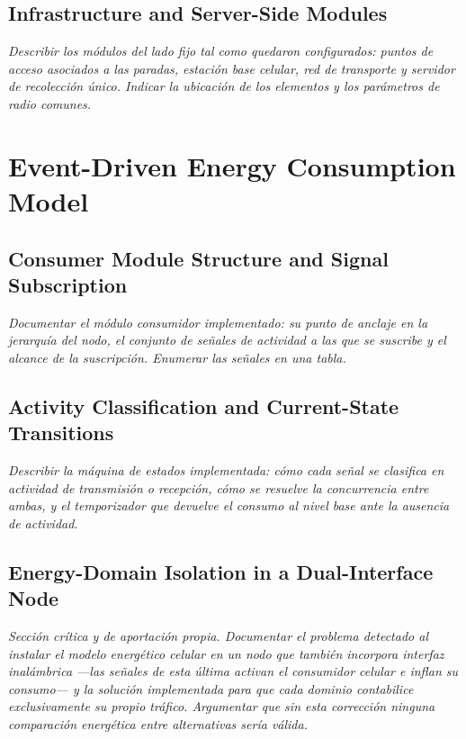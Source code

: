 \subsection{Infrastructure and Server-Side Modules}
\emph{Describir los módulos del lado fijo tal como quedaron configurados: puntos
de acceso asociados a las paradas, estación base celular, red de transporte y
servidor de recolección único. Indicar la ubicación de los elementos y los
parámetros de radio comunes.}

\section{Event-Driven Energy Consumption Model}

\subsection{Consumer Module Structure and Signal Subscription}
\emph{Documentar el módulo consumidor implementado: su punto de anclaje en la
jerarquía del nodo, el conjunto de señales de actividad a las que se suscribe y
el alcance de la suscripción. Enumerar las señales en una tabla.}

\subsection{Activity Classification and Current-State Transitions}
\emph{Describir la máquina de estados implementada: cómo cada señal se clasifica
en actividad de transmisión o recepción, cómo se resuelve la concurrencia entre
ambas, y el temporizador que devuelve el consumo al nivel base ante la ausencia
de actividad.}

\subsection{Energy-Domain Isolation in a Dual-Interface Node}
\emph{Sección crítica y de aportación propia. Documentar el problema detectado al
instalar el modelo energético celular en un nodo que también incorpora interfaz
inalámbrica —las señales de esta última activan el consumidor celular e inflan su
consumo— y la solución implementada para que cada dominio contabilice
exclusivamente su propio tráfico. Argumentar que sin esta corrección ninguna
comparación energética entre alternativas sería válida.}

